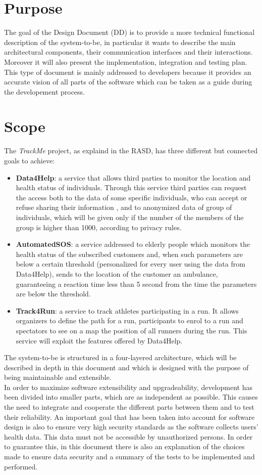 \section{Purpose}
The goal of the Design Document (DD) is to provide a more technical functional description of the system-to-be, in particular it wants to describe the main architectural components, their communication interfaces and their interactions. Moreover it will also present the implementation, integration and testing plan.
This type of document is mainly addressed to developers because it provides an accurate vision of all parts of the software which can be taken as a guide during the developement process.
\section{Scope}
The \textit{TrackMe} project, as explaind in the RASD, has three different but connected goals to achieve:
\begin{itemize}
  \item \textbf{Data4Help}: a service that allows third parties to monitor the location and health status of individuals. Through this service third parties can request the access both to the data of some specific individuals, who can accept or refuse sharing their information , and to anonymized data of group of individuals, which will be given only if the number of the members of the group is higher than 1000, according to privacy rules.
  \item \textbf{AutomatedSOS}: a service addressed to elderly people which monitors the health status of the subscribed customers and, when such parameters are below a certain threshold (personalized for every user using the data from Data4Help), sends to the location of the customer an ambulance, guaranteeing a reaction time less than 5 second from the time the parameters are below the threshold.
  \item \textbf{Track4Run}: a service to track athletes participating in a run. It allows organizers to define the path for a run, participants to enrol to a run and spectators to see on a map the position of all runners during the run. This service will exploit the features offered by Data4Help.
\end{itemize}
The system-to-be is structured in a four-layered architecture, which will be described in depth in this document and which is designed with the purpose of being maintainable and extensible.\\
In order to maximize software extensibility and upgradeability, development has been divided into smaller parts, which are as independent as possible.
This causes the need to integrate and cooperate the different parts between them and to test their reliability.
An important goal that has been taken into account for software design is also to ensure very high security standards as the software collects users' health data. This data must not be accessible by unauthorized persons.
In order to guarantee this, in this document there is also an explanation of the choices made to ensure data security and a summary of the tests to be implemented and performed.

